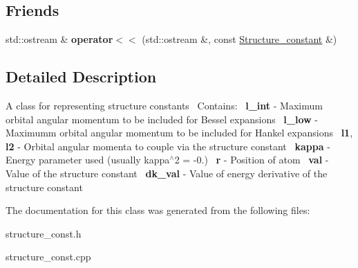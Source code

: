 \subsection*{Friends}
\begin{DoxyCompactItemize}
\item 
\mbox{\label{classStructure__constant_af633c21967d44869e756f9f33428cb6a}} 
std\+::ostream \& {\bfseries operator$<$$<$} (std\+::ostream \&, const \hyperlink{classStructure__constant}{Structure\+\_\+constant} \&)
\end{DoxyCompactItemize}


\subsection{Detailed Description}
A class for representing structure constants~\newline
Contains\+:~\newline
{\bfseries l\+\_\+int} -\/ Maximum orbital angular momentum to be included for Bessel expansions~\newline
 {\bfseries l\+\_\+low} -\/ Maximumm orbital angular momentum to be included for Hankel expansions~\newline
 {\bfseries l1}, {\bfseries l2} -\/ Orbital angular momenta to couple via the structure constant~\newline
{\bfseries kappa} -\/ Energy parameter used (usually kappa$^\wedge$2 = -\/0.)~\newline
{\bfseries r} -\/ Position of atom~\newline
{\bfseries val} -\/ Value of the structure constant~\newline
{\bfseries dk\+\_\+val} -\/ Value of energy derivative of the structure constant~\newline


The documentation for this class was generated from the following files\+:\begin{DoxyCompactItemize}
\item 
structure\+\_\+const.\+h\item 
structure\+\_\+const.\+cpp\end{DoxyCompactItemize}
